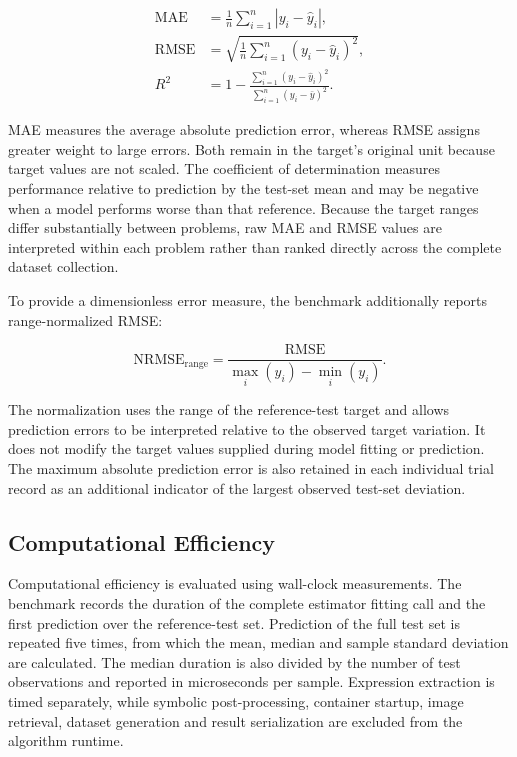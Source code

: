 \documentclass[12pt,oneside,bibtotoc,liststotoc]{scrbook}
\begin{document}
\begin{align}
    \mathrm{MAE} &= \frac{1}{n}\sum_{i=1}^{n}\left|y_i-\hat{y}_i\right|,\\
    \mathrm{RMSE} &= \sqrt{\frac{1}{n}\sum_{i=1}^{n}\left(y_i-\hat{y}_i\right)^2},\\
    R^2 &= 1-\frac{\sum_{i=1}^{n}\left(y_i-\hat{y}_i\right)^2}{\sum_{i=1}^{n}\left(y_i-\bar{y}\right)^2}.
\end{align}

MAE measures the average absolute prediction error, whereas RMSE assigns greater weight to large errors. Both remain in the target's original unit because target values are not scaled. The coefficient of determination measures performance relative to prediction by the test-set mean and may be negative when a model performs worse than that reference. Because the target ranges differ substantially between problems, raw MAE and RMSE values are interpreted within each problem rather than ranked directly across the complete dataset collection.

To provide a dimensionless error measure, the benchmark additionally reports range-normalized RMSE:

\begin{equation}
    \mathrm{NRMSE}_{\mathrm{range}}=\frac{\mathrm{RMSE}}{\max_i(y_i)-\min_i(y_i)}.
\end{equation}

The normalization uses the range of the reference-test target and allows prediction errors to be interpreted relative to the observed target variation. It does not modify the target values supplied during model fitting or prediction. The maximum absolute prediction error is also retained in each individual trial record as an additional indicator of the largest observed test-set deviation.

\subsection{Computational Efficiency}

Computational efficiency is evaluated using wall-clock measurements. The benchmark records the duration of the complete estimator fitting call and the first prediction over the reference-test set. Prediction of the full test set is repeated five times, from which the mean, median and sample standard deviation are calculated. The median duration is also divided by the number of test observations and reported in microseconds per sample. Expression extraction is timed separately, while symbolic post-processing, container startup, image retrieval, dataset generation and result serialization are excluded from the algorithm runtime.
\end{document}
